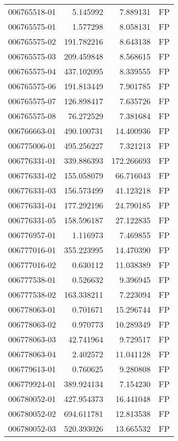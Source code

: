 \begin{tabular}{lrrl}
006765518-01 &    5.145992 &     7.889131 &   FP \\
006765575-01 &    1.577298 &     8.058131 &   FP \\
006765575-02 &  191.782216 &     8.643138 &   FP \\
006765575-03 &  209.459848 &     8.568615 &   FP \\
006765575-04 &  437.102095 &     8.339555 &   FP \\
006765575-06 &  191.813449 &     7.901785 &   FP \\
006765575-07 &  126.898417 &     7.635726 &   FP \\
006765575-08 &   76.272529 &     7.381684 &   FP \\
006766663-01 &  490.100731 &    14.400936 &   FP \\
006775006-01 &  495.256227 &     7.321213 &   FP \\
006776331-01 &  339.886393 &   172.266693 &   FP \\
006776331-02 &  155.058079 &    66.716043 &   FP \\
006776331-03 &  156.573499 &    41.123218 &   FP \\
006776331-04 &  177.292196 &    24.790185 &   FP \\
006776331-05 &  158.596187 &    27.122835 &   FP \\
006776957-01 &    1.116973 &     7.469855 &   FP \\
006777016-01 &  355.223995 &    14.470390 &   FP \\
006777016-02 &    0.630112 &    11.038389 &   FP \\
006777538-01 &    0.526632 &     9.396945 &   FP \\
006777538-02 &  163.338211 &     7.223094 &   FP \\
006778063-01 &    0.701671 &    15.296744 &   FP \\
006778063-02 &    0.970773 &    10.289349 &   FP \\
006778063-03 &   42.741964 &     9.729517 &   FP \\
006778063-04 &    2.402572 &    11.041128 &   FP \\
006779613-01 &    0.760625 &     9.280808 &   FP \\
006779924-01 &  389.924134 &     7.154230 &   FP \\
006780052-01 &  427.954373 &    16.441048 &   FP \\
006780052-02 &  694.611781 &    12.813538 &   FP \\
006780052-03 &  520.393026 &    13.665532 &   FP \\

\end{tabular}
